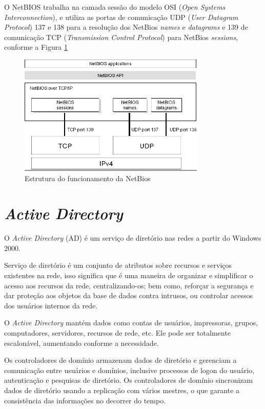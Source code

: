 O NetBIOS trabalha na camada sessão do modelo OSI (\textit{Open Systems Interconnection}), e utiliza as portas de comunicação UDP (\textit{User Datagram Protocol}) 137 e 138 para a resolução dos NetBios \textit{names} e \textit{datagrams} e 139 de comunicação TCP (\textit{Transmission Control Protocol}) para NetBios \textit{sessions}, conforme a Figura \ref{netbios}

\begin{figure}[ht]
   	\centering
    \includegraphics[width=0.5 \textwidth]{figuras/netbios}
   	\caption{Estrutura do funcionamento da NetBios \cite{NETBIOS}}
    \label{netbios}
\end{figure}

\pagebreak

\section{\textit{Active Directory}}

O \textit{Active Directory} (AD) é um serviço de diretório nas redes a partir do Windows 2000.

Serviço de diretório é um conjunto de atributos sobre recursos e serviços existentes na rede, isso significa que é uma maneira de organizar e simplificar o acesso aos recursos da rede, centralizando-os; bem como, reforçar a segurança e dar proteção aos objetos da base de dados contra intrusos, ou controlar acessos dos usuários internos da rede.

O \textit{Active Directory} mantém dados como contas de usuários, impressoras, grupos, computadores, servidores, recursos de rede, etc. Ele pode ser totalmente escalonável, aumentando conforme a necessidade.\cite{LOSANO}

Os controladores de domínio armazenam dados de diretório e gerenciam a comunicação entre usuários e domínios, inclusive processos de logon do usuário, autenticação e pesquisas de diretório. Os controladores de domínio sincronizam dados de diretório usando a replicação com vários mestres, o que garante a consistência das informações no decorrer do tempo.\cite{AD}

